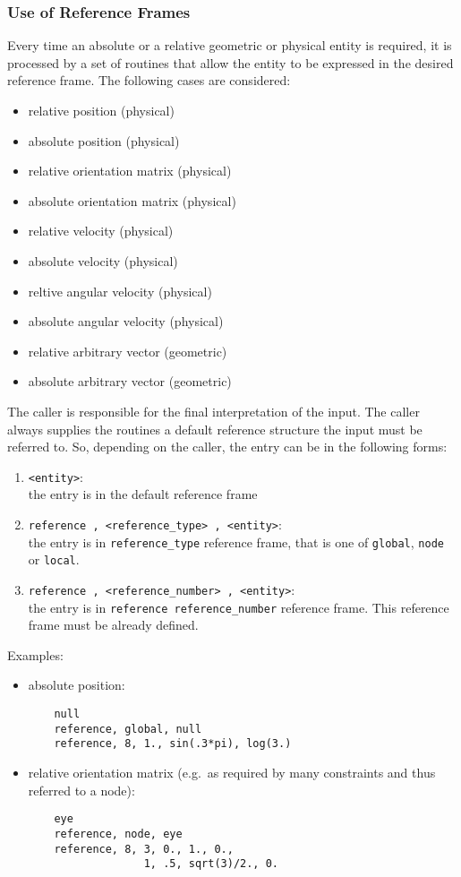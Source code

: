 \subsubsection{Use of Reference Frames}
Every time an absolute or a relative geometric or physical entity is
required, it is processed by a set of routines that allow the entity to be
expressed in the desired reference frame.
The following cases are considered:
\begin{itemize}
    \item relative position (physical)
    \item absolute position (physical)
    \item relative orientation matrix (physical)
    \item absolute orientation matrix (physical)
    \item relative velocity (physical)
    \item absolute velocity (physical)
    \item reltive angular velocity (physical)
    \item absolute angular velocity (physical)
    \item relative arbitrary vector (geometric)
    \item absolute arbitrary vector (geometric)    
\end{itemize}
The caller is responsible for the final interpretation of the input. 
The caller always supplies the routines a default reference structure
the input must be referred to.
So, depending on the caller, the entry can be in the following forms:
\begin{enumerate}
    \item \texttt{<entity>}: \\ 
    the entry is in the default reference frame
    \item \texttt{reference , <reference\_type> , <entity>}: \\
    the entry is in \texttt{reference\_type} reference frame, 
    that is one of \texttt{global}, 
    \texttt{node} or \texttt{local}.
    \item \texttt{reference , <reference\_number> , <entity>}: \\
    the entry is in \texttt{reference reference\_number} reference frame. 
    This reference frame must be already defined. 
\end{enumerate}
Examples:
\begin{itemize}
    \item absolute position:
    \begin{verbatim}
    null
    reference, global, null
    reference, 8, 1., sin(.3*pi), log(3.)
    \end{verbatim}
    \item relative orientation matrix (e.g.\ as required by many constraints and
    thus referred to a node):
    \begin{verbatim}
    eye
    reference, node, eye
    reference, 8, 3, 0., 1., 0., 
                  1, .5, sqrt(3)/2., 0.
    \end{verbatim}
\end{itemize}
